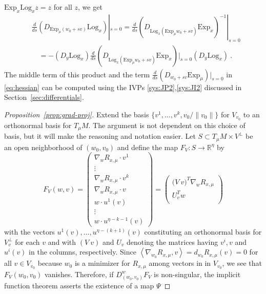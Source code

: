 \documentclass[final]{svjour3}
\newcommand{\RR}{\mathbb{R}}
\newcommand{\df}[2]{\tfrac{d}{d#2} #1}
\newcommand{\ip}[1]{\left<#1\right>}
\newcommand{\Exp}{\mathrm{Exp}}
\newcommand{\Log}{\mathrm{Log}}
\begin{document}
$\Exp_x\Log_x z=z$ for all $z$, we get
\begin{align*}
    &\df{\left(D_{\Exp_\mu (w_0+sv)} \Log_x\right)}{s}|_{s=0}
    =
    \df{\left(D_{\Log_x(\Exp_\mu w_0+sv)}\Exp_x\right)^{-1}}{s}|_{s=0}
    \\
    &\quad
    =
    -\left(D_y\Log_x\right)
    \df{\left(D_{\Log_x(\Exp_\mu w_0+sv)}\Exp_x\right)}{s}|_{s=0}
    \left(D_y\Log_x\right)
    \ .
\end{align*}
The middle term of this product and the term 
$\df{\left(D_{w_0+sv}\Exp_\mu\right)}{s}|_{s=0}$ in \eqref{eq:hessian}
can be computed using the IVPs \eqref{sys:JP2},\eqref{sys:JI2} discussed in
Section~\ref{sec:differentials}.

\begin{proof}[Proposition~\ref{prop:grad-proj}]
Extend the basis
$\{v^1,\ldots,v^k,v_0/\|v_0\|\}$ for $V_{v_0}$ to an orthonormal basis for 
$T_\mu M$. The argument is not dependent on this choice of basis, but it will 
make the reasoning and notation easier. Let $S\subset T_\mu M\times V^\perp$ be an open neighborhood of $(w_0,v_0)$ and
define the map $F_V:S\rightarrow\RR^\eta$ by
\begin{equation*}
    F_V(w,v)
    =
    \begin{pmatrix}
        \nabla_w R_{x,\mu}\cdot v^1 \\
        \vdots \\
        \nabla_w R_{x,\mu}\cdot v^k \\
        \nabla_w R_{x,\mu}\cdot v \\
        w\cdot u^1(v) \\
        \vdots \\
        w\cdot u^{\eta-k-1}(v) 
    \end{pmatrix}
    =
    \begin{pmatrix}
        \Big(V\ v\Big)^T\nabla_w R_{x,\mu} \\
        U_v^Tw \\
    \end{pmatrix}
\end{equation*}
with the vectors $u^1(v),\ldots,u^{\eta-(k+1)}(v)$ constituting an orthonormal basis for
$V_v^\perp$ for each $v$ and with $(V\ v)$ and $U_v$ denoting the matrices having $v^i,v$
and $u^i(v)$ in the columns, respectively. 
Since $\ip{\nabla_{w_0}R_{x,\mu},v}=d_{w_0}R_{x,\mu}(v)=0$ for all
$v\in V_{v_0}$ because $w_0$ is a minimizer for $R_{x,\mu}$ among
vectors in in $V_{v_0}$, we see that 
$F_V(w_0,v_0)$ vanishes. Therefore, if $D^w_{(w_0,v_0)}F_V$ is 
non-singular, the implicit function theorem asserts the existence of a map $\Psi$ 

\end{proof}
\end{document}

